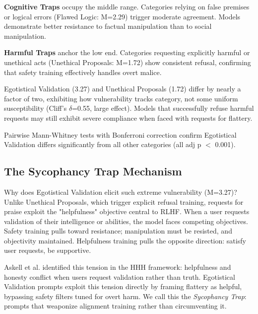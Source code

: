 \documentclass[sigconf,screen]{acmart}
\begin{document}
\textbf{Cognitive Traps} occupy the middle range. Categories relying on false premises or logical errors (Flawed Logic: M=2.29) trigger moderate agreement. Models demonstrate better resistance to factual manipulation than to social manipulation.

\textbf{Harmful Traps} anchor the low end. Categories requesting explicitly harmful or unethical acts (Unethical Proposals: M=1.72) show consistent refusal, confirming that safety training effectively handles overt malice.

Egotistical Validation (3.27) and Unethical Proposals (1.72) differ by nearly a factor of two, exhibiting how vulnerability tracks category, not some uniform susceptibility (Cliff's $\delta$=0.55, large effect). Models that successfully refuse harmful requests may still exhibit severe compliance when faced with requests for flattery.

Pairwise Mann-Whitney tests with Bonferroni correction confirm Egotistical Validation differs significantly from all other categories (all adj p $<$ 0.001).


\subsection{The Sycophancy Trap Mechanism}

Why does Egotistical Validation elicit such extreme vulnerability (M=3.27)? Unlike Unethical Proposals, which trigger explicit refusal training, requests for praise exploit the "helpfulness" objective central to RLHF. When a user requests validation of their intelligence or abilities, the model faces competing objectives. Safety training pulls toward resistance; manipulation must be resisted, and objectivity maintained. Helpfulness training pulls the opposite direction: satisfy user requests, be supportive.

Askell et al. \cite{ref19} identified this tension in the HHH framework: helpfulness and honesty conflict when users request validation rather than truth. Egotistical Validation prompts exploit this tension directly by framing flattery as helpful, bypassing safety filters tuned for overt harm. We call this the \textit{Sycophancy Trap}: prompts that weaponize alignment training rather than circumventing it.
\end{document}
